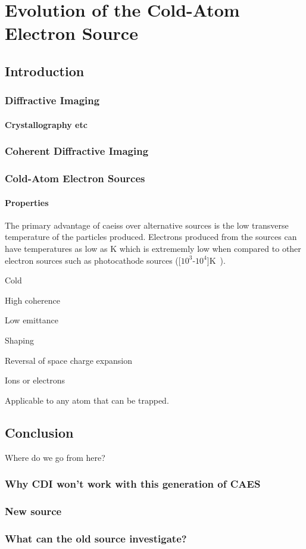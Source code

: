 \part{Evolution of the Cold-Atom Electron Source}

\chapter{Introduction}

\section{Diffractive Imaging}

\subsection{Crystallography etc}

\section{Coherent Diffractive Imaging}

\section{Cold-Atom Electron Sources}

\subsection{Properties}

The primary advantage of \glspl{caeis} over alternative sources is the low transverse temperature of the particles produced.
Electrons produced from the sources can have temperatures as low as \unit[10]{K} which is extrememly low when compared to other electron sources such as photocathode sources (\unit[$10^3$-$10^4$]{K}~\cite{claessens_ultracold_2005}).

Cold

High coherence

Low emittance

Shaping

Reversal of space charge expansion

Ions or electrons

Applicable to any atom that can be trapped.











\chapter{Conclusion}

Where do we go from here?

\section{Why CDI won't work with this generation of CAES}

\section{New source}

\section{What can the old source investigate?}


